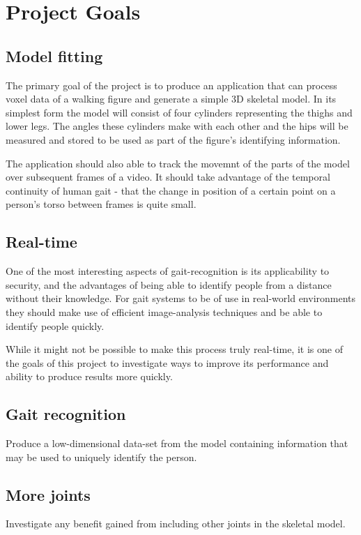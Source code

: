 \section{Project Goals}

\subsection{Model fitting}

The primary goal of the project is to produce an application that can process voxel data of a walking figure and generate a simple 3D skeletal model.
In its simplest form the model will consist of four cylinders representing the thighs and lower legs.
The angles these cylinders make with each other and the hips will be measured and stored to be used as part of the figure's identifying information.

The application should also able to track the movemnt of the parts of the model over subsequent frames of a video.
It should take advantage of the temporal continuity of human gait - that the change in position of a certain point on a person's torso between frames is quite small.


\subsection{Real-time}

One of the most interesting aspects of gait-recognition is its applicability to security, and the advantages of being able to identify people from a distance without their knowledge.
For gait systems to be of use in real-world environments they should make use of efficient image-analysis techniques and be able to identify people quickly.

While it might not be possible to make this process truly real-time, it is one of the goals of this project to investigate ways to improve its performance and ability to produce results more quickly.


\subsection{Gait recognition}

Produce a low-dimensional data-set from the model containing information that may be used to uniquely identify the person.

\subsection{More joints}

Investigate any benefit gained from including other joints in the skeletal model.

